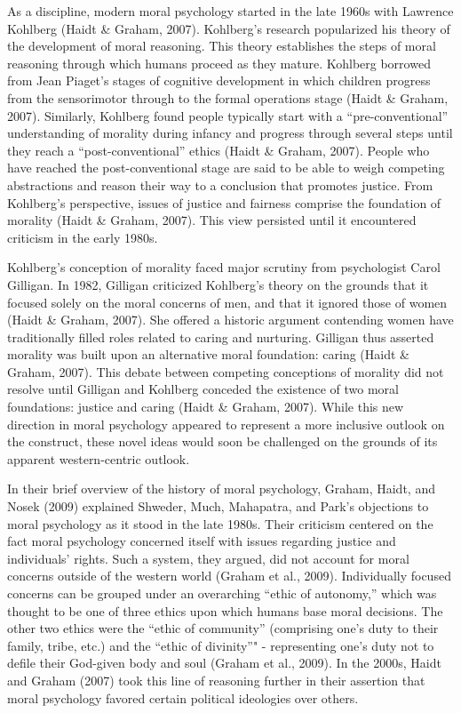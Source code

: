 \documentclass[,man]{apa6}
\begin{document}
As a discipline, modern moral psychology started in the late 1960s with Lawrence Kohlberg (Haidt \& Graham, 2007). Kohlberg's research popularized his theory of the development of moral reasoning. This theory establishes the steps of moral reasoning through which humans proceed as they mature. Kohlberg borrowed from Jean Piaget's stages of cognitive development in which children progress from the sensorimotor through to the formal operations stage (Haidt \& Graham, 2007). Similarly, Kohlberg found people typically start with a \enquote{pre-conventional} understanding of morality during infancy and progress through several steps until they reach a \enquote{post-conventional} ethics (Haidt \& Graham, 2007). People who have reached the post-conventional stage are said to be able to weigh competing abstractions and reason their way to a conclusion that promotes justice. From Kohlberg's perspective, issues of justice and fairness comprise the foundation of morality (Haidt \& Graham, 2007). This view persisted until it encountered criticism in the early 1980s.

Kohlberg's conception of morality faced major scrutiny from psychologist Carol Gilligan. In 1982, Gilligan criticized Kohlberg's theory on the grounds that it focused solely on the moral concerns of men, and that it ignored those of women (Haidt \& Graham, 2007). She offered a historic argument contending women have traditionally filled roles related to caring and nurturing. Gilligan thus asserted morality was built upon an alternative moral foundation: caring (Haidt \& Graham, 2007). This debate between competing conceptions of morality did not resolve until Gilligan and Kohlberg conceded the existence of two moral foundations: justice and caring (Haidt \& Graham, 2007). While this new direction in moral psychology appeared to represent a more inclusive outlook on the construct, these novel ideas would soon be challenged on the grounds of its apparent western-centric outlook.

In their brief overview of the history of moral psychology, Graham, Haidt, and Nosek (2009) explained Shweder, Much, Mahapatra, and Park's objections to moral psychology as it stood in the late 1980s. Their criticism centered on the fact moral psychology concerned itself with issues regarding justice and individuals' rights. Such a system, they argued, did not account for moral concerns outside of the western world (Graham et al., 2009). Individually focused concerns can be grouped under an overarching \enquote{ethic of autonomy,} which was thought to be one of three ethics upon which humans base moral decisions. The other two ethics were the \enquote{ethic of community} (comprising one's duty to their family, tribe, etc.) and the \enquote{ethic of divinity}" - representing one's duty not to defile their God-given body and soul (Graham et al., 2009). In the 2000s, Haidt and Graham (2007) took this line of reasoning further in their assertion that moral psychology favored certain political ideologies over others.
\end{document}

